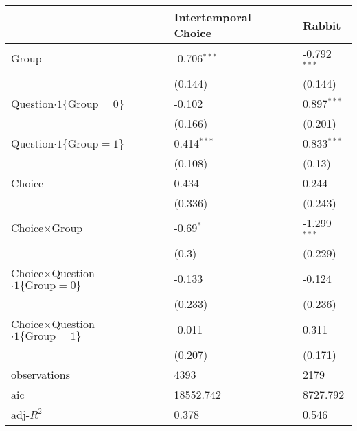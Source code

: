 \begin{tabular}{lll}
\hline
 & Intertemporal Choice & Rabbit \\
\hline
Group & -0.706$^{***}$ & -0.792$^{***}$ \\
 & (0.144) & (0.144) \\
Question$\cdot1\{\text{Group}=0\}$ & -0.102 & 0.897$^{***}$ \\
 & (0.166) & (0.201) \\
Question$\cdot1\{\text{Group}=1\}$ & 0.414$^{***}$ & 0.833$^{***}$ \\
 & (0.108) & (0.13) \\
Choice & 0.434 & 0.244 \\
 & (0.336) & (0.243) \\
Choice$\times$Group & -0.69$^{*}$ & -1.299$^{***}$ \\
 & (0.3) & (0.229) \\
Choice$\times$Question$\cdot1\{\text{Group}=0\}$ & -0.133 & -0.124 \\
 & (0.233) & (0.236) \\
Choice$\times$Question$\cdot1\{\text{Group}=1\}$ & -0.011 & 0.311 \\
 & (0.207) & (0.171) \\\hline

observations & 4393 & 2179 \\
aic & 18552.742 & 8727.792 \\
adj-$R^2$ & 0.378 & 0.546 \\
\hline
\end{tabular}
